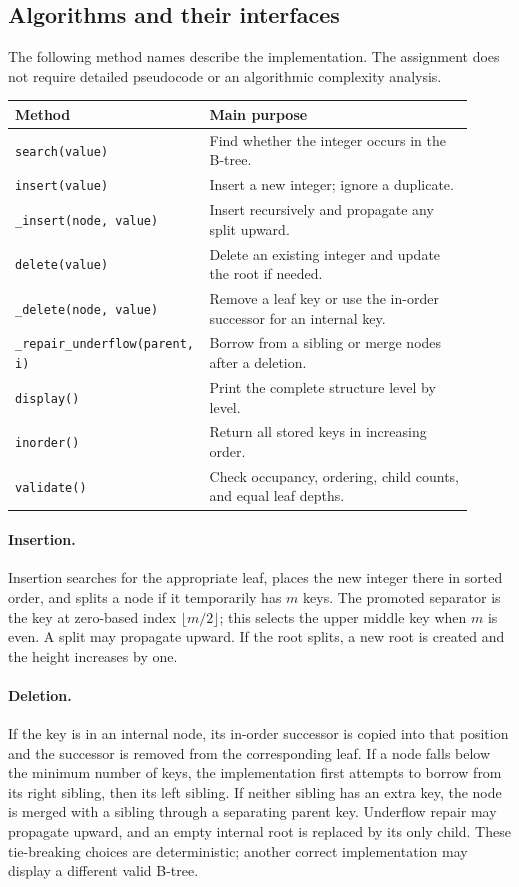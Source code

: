 \documentclass{cisXXX}
\begin{document}
\subsection*{Algorithms and their interfaces}
The following method names describe the implementation. The assignment does
not require detailed pseudocode or an algorithmic complexity analysis.
\begin{center}
\begin{tabular}{@{}p{0.33\linewidth}p{0.58\linewidth}@{}}
\toprule
Method & Main purpose\\
\midrule
\texttt{search(value)} & Find whether the integer occurs in the B-tree.\\
\texttt{insert(value)} & Insert a new integer; ignore a duplicate.\\
\texttt{\_insert(node, value)} & Insert recursively and propagate any split upward.\\
\texttt{delete(value)} & Delete an existing integer and update the root if needed.\\
\texttt{\_delete(node, value)} & Remove a leaf key or use the in-order successor for an internal key.\\
\texttt{\_repair\_underflow(parent, i)} & Borrow from a sibling or merge nodes after a deletion.\\
\texttt{display()} & Print the complete structure level by level.\\
\texttt{inorder()} & Return all stored keys in increasing order.\\
\texttt{validate()} & Check occupancy, ordering, child counts, and equal leaf depths.\\
\bottomrule
\end{tabular}
\end{center}

\paragraph{Insertion.}
Insertion searches for the appropriate leaf, places the new integer there in
sorted order, and splits a node if it temporarily has $m$ keys. The promoted
separator is the key at zero-based index $\lfloor m/2\rfloor$; this selects
the upper middle key when $m$ is even. A split may propagate upward. If the
root splits, a new root is created and the height increases by one.

\paragraph{Deletion.}
If the key is in an internal node, its in-order successor is copied into that
position and the successor is removed from the corresponding leaf. If a node
falls below the minimum number of keys, the implementation first attempts
to borrow from its right sibling, then its left sibling. If neither sibling
has an extra key, the node is merged with a sibling through a separating
parent key. Underflow repair may propagate upward, and an empty internal
root is replaced by its only child. These tie-breaking choices are
deterministic; another correct implementation may display a different valid
B-tree.
\end{document}
